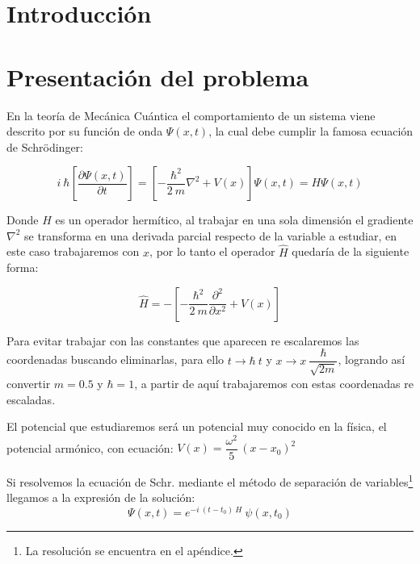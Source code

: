 \documentclass[10pt,onecolumn]{article}
\begin{document}
\tableofcontents %
\newpage

\HRule{0.5pt} %

\begin{abstract}
RESUMEN
\end{abstract}

\section{Introducción}




\section{Presentación del problema}
En la teoría de Mecánica Cuántica el comportamiento de un sistema viene descrito por su función de onda $\Psi(x,t)$, la cual debe cumplir la famosa ecuación de Schrödinger:

\begin{equation}
    i\ \hbar [\dfrac{\partial \Psi(x,t)}{\partial t}] = [-\dfrac{\hbar^2}{2\ m}\nabla^2 + V(x)]\Psi(x,t) = H \Psi(x,t)
\end{equation}

Donde $H$ es un operador hermítico, al trabajar en una sola dimensión el gradiente $\nabla^2$ se transforma en una derivada parcial respecto de la variable a estudiar, en este caso trabajaremos con $x$, por lo tanto el operador $\hat{H}$ quedaría de la siguiente forma:

\begin{equation}\label{eq:Operador_H}
\hat{H} = - [-\dfrac{\hbar^2}{2\ m}\dfrac{\partial^2}{\partial x ^2} + V(x) ]   
\end{equation}

Para evitar trabajar con las constantes que aparecen re escalaremos las coordenadas buscando eliminarlas, para ello $t\rightarrow \hbar\ t$ y $x\rightarrow x\ \dfrac{\hbar}{\sqrt{2m}}$, logrando así convertir $m = 0.5$ y $\hbar = 1$, a partir de aquí trabajaremos con estas coordenadas re escaladas.


El potencial que estudiaremos será un potencial muy conocido en la física, el potencial armónico, con ecuación: $V(x)=\dfrac{\omega^{2}}{5}\,{}(x-x_{0})^{2}$

Si resolvemos la ecuación de Schr. mediante el método de separación de variables\footnote{La resolución se encuentra en el apéndice.} llegamos a la expresión de la solución:
\begin{equation}\label{eq:SolucionFormal}
    \Psi(x,t)= e^{-i\ (t-t_0)\  H}\ \psi(x,t_0)
\end{equation}
\end{document}
